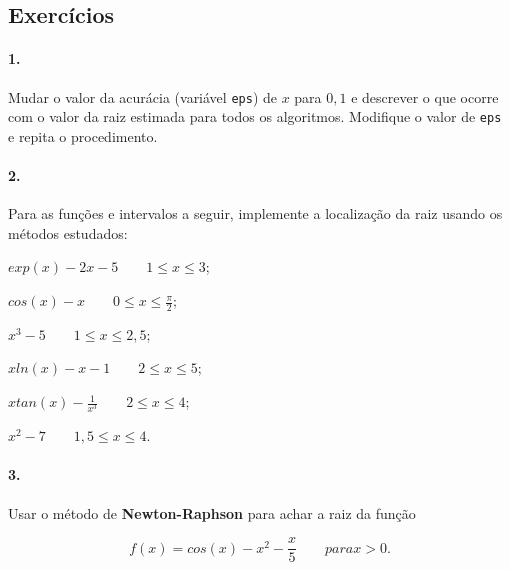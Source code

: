 \subsection*{Exercícios}

\paragraph{1.} Mudar o valor da acurácia (variável {\tt eps}) de $x$ para $0,1$ e
descrever o que ocorre com o valor da raiz estimada para todos 
os algoritmos. Modifique o valor de {\tt eps} e repita o procedimento.

\paragraph{2.} Para as funções e intervalos a seguir, implemente a localização da raiz
usando os métodos estudados:

\begin{enumerate}[a)]
	\begin{minipage}{0.5\textwidth}
	\item $exp(x) -2x -5\qquad 1\leq x\leq 3$;
	\item $cos(x)-x\qquad 0\leq x\leq\frac{\pi}{2}$; 
	\item $x^3-5\qquad 1\leq x \leq 2,5$;
	\end{minipage}
	\begin{minipage}{0.5\textwidth}
	\item $xln(x)-x-1\qquad 2\leq x\leq 5 $;
	\item $xtan(x)-\frac{1}{x^3}\qquad 2\leq x\leq 4$;
	\item $x^2-7\qquad 1,5\leq x\leq 4$.
	\end{minipage}
\end{enumerate}

\paragraph{3.} Usar o método de {\bf Newton-Raphson} para achar
a raiz da função 

\begin{equation}
	f(x) = cos(x) - x^2 - \frac{x}{5}\qquad para x>0.
\end{equation}
